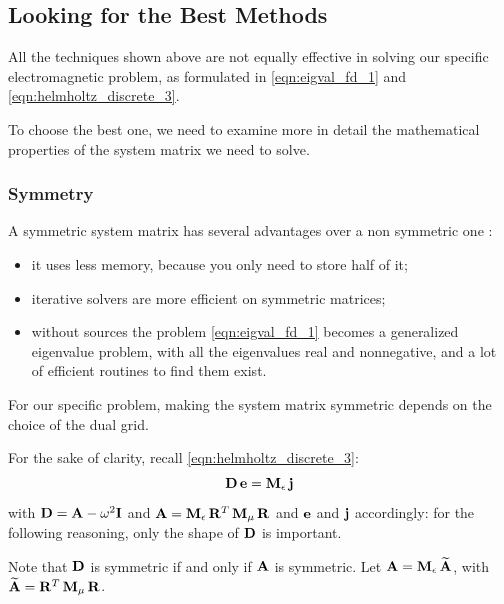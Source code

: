 
\subsection{Looking for the Best Methods}

All the techniques shown above are not equally effective in solving
our specific electromagnetic problem, as formulated in
\eqref{eqn:eigval_fd_1} and \eqref{eqn:helmholtz_discrete_3}.

To choose the best one, we need to examine more in detail the
mathematical properties of the system matrix we need to solve.

\subsubsection{Symmetry}

A symmetric system matrix has several advantages over a non symmetric
one \cite{schuhmann_whitney,schuhmann_stability}:
\begin{itemize}
\item it uses less memory, because you only need to store half of it;
\item iterative solvers are more efficient on symmetric matrices;
\item without sources the problem \eqref{eqn:eigval_fd_1} becomes a
  generalized eigenvalue problem, with all the eigenvalues real and
  nonnegative, and a lot of efficient routines to find them exist.
\end{itemize}

For our specific problem, making the system matrix symmetric depends on the
choice of the dual grid.

For the sake of clarity, recall \eqref{eqn:helmholtz_discrete_3}:
\begin{equation} \label{eqn:symmetry_system}
  {\mathbf{D}\,\mathbf{e}} = {\mathbf{M}_\epsilon\,\mathbf{j}}
\end{equation}
with $\mathbf{D} = \mathbf{A} - \omega^2 \mathbf{I}$ and $\mathbf{A} =
{\mathbf{M}_\epsilon\,{{\mathbf{R}}^T\,{\mathbf{M}_\mu\,\mathbf{R}}}}$
and $\mathbf{e}$ and $\mathbf{j}$ accordingly: for the following
reasoning, only the shape of $\mathbf{D}$ is important.

Note that $\mathbf{D}$ is symmetric if and only if $\mathbf{A}$ is
symmetric. Let $\mathbf{A} = {\mathbf{M}_\epsilon\,\widetilde{\mathbf{A}}}$,
with $\widetilde{\mathbf{A}} =
{{\mathbf{R}}^T\,{\mathbf{M}_\mu\,\mathbf{R}}}$.

